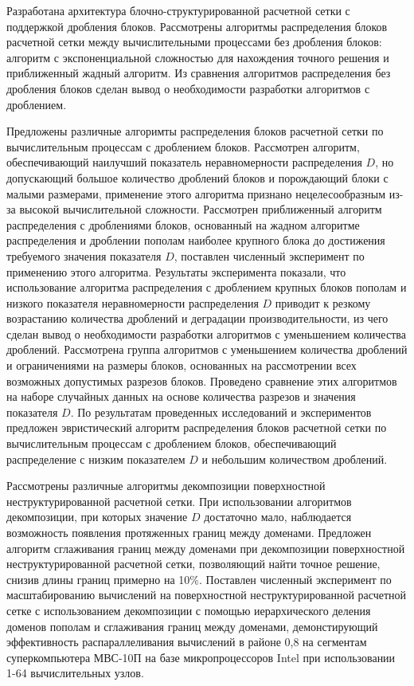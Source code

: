 Разработана архитектура блочно-структурированной расчетной сетки с поддержкой дробления блоков.
Рассмотрены алгоритмы распределения блоков расчетной сетки между вычислительными процессами без дробления блоков: алгоритм с экспоненциальной сложностью для нахождения точного решения и приближенный жадный алгоритм.
Из сравнения алгоритмов распределения без дробления блоков сделан вывод о необходимости разработки алгоритмов с дроблением.

Предложены различные алгоримты распределения блоков расчетной сетки по вычислительным процессам с дроблением блоков.
Рассмотрен алгоритм, обеспечивающий наилучший показатель неравномерности распределения $D$, но допускающий большое количество дроблений блоков и порождающий блоки с малыми размерами, применение этого алгоритма признано нецелесообразным из-за высокой вычислительной сложности.
Рассмотрен приближенный алгоритм распределения с дроблениями блоков, основанный на жадном алгоритме распределения и дроблении пополам наиболее крупного блока до достижения требуемого значения показателя $D$, поставлен численный эксперимент по применению этого алгоритма.
Результаты эксперимента показали, что использование алгоритма распределения с дроблением крупных блоков пополам и низкого показателя неравномерности распределения $D$ приводит к резкому возрастанию количества дроблений и деградации производительности, из чего сделан вывод о необходимости разработки алгоритмов с уменьшением количества дроблений.
Рассмотрена группа алгоритмов с уменьшением количества дроблений и ограничениями на размеры блоков, основанных на рассмотрении всех возможных допустимых разрезов блоков.
Проведено сравнение этих алгоритмов на наборе случайных данных на основе количества разрезов и значения показателя $D$.
По результатам проведенных исследований и экспериментов предложен эвристический алгоритм распределения блоков расчетной сетки по вычислительным процессам с дроблением блоков, обеспечивающий распределение с низким показателем $D$ и небольшим количеством дроблений.

Рассмотрены различные алгоритмы декомпозиции поверхностной неструктурированной расчетной сетки.
При использовании алгоритмов декомпозиции, при которых значение $D$ достаточно мало, наблюдается возможность появления протяженных границ между доменами.
Предложен алгоритм сглаживания границ между доменами при декомпозиции поверхностной неструктурированной расчетной сетки, позволяющий найти точное решение, снизив длины границ примерно на 10\%.
Поставлен численный эксперимент по масштабированию вычислений на поверхностной неструктурированной расчетной сетке с использованием декомпозиции с помощью иерархического деления доменов пополам и сглаживания границ между доменами, демонстирующий эффективность распараллеливания вычислений в районе 0,8 на сегментам суперкомпьютера МВС-10П на базе микропроцессоров Intel при использовании 1-64 вычислительных узлов.

